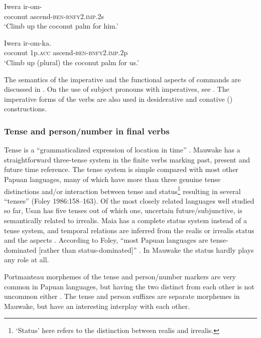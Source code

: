 \ea%
\label{ex:3:x232}
\gll Iwera ir-om- \\
coconut ascend-\textsc{ben}-\textsc{bnfy}2.\textsc{imp}.2s \\
\glt`Climb up the coconut palm for him.'
\z

\ea%
\label{ex:3:x233}
\gll Iwera  ir-om-ka. \\
coconut 1p.\textsc{acc} ascend-\textsc{ben}-\textsc{bnfy}2.\textsc{imp}.2p \\
\glt`Climb up (plural) the coconut palm for us.'
\z

The semantics of the imperative and the functional aspects of commands are discussed in . On the use of subject pronouns with imperatives, see . The imperative forms of the verbs are also used in desiderative  and conative () constructions. 

\subsubsection{Tense and person/number in final verbs}\label{sec:3.8.3.4}
{}
Tense is a ``{grammaticalized expression of location in time}'' \citep[9]{Comrie1985}. Mauwake has a straightforward three-tense system in the finite verbs marking past, present and future time reference. The tense system is simple compared with most other Papuan languages, many of which have more than three genuine tense distinctions and/or interaction between tense and status\footnote{`Status' here refers to the distinction between realis and irrealis.} resulting in several ``tenses'' ({Foley 1986}:158--163). Of the most closely related languages well studied so far, Usan has five tenses \citep[98]{Reesink1987} out of which one, uncertain future/subjunctive, is semantically related to irrealis. Maia has a complete status system instead of a tense system, and temporal relations are inferred from the realis or irrealis status and the aspects \citep[55]{Hardin2002}. According to {Foley}, {``most Papuan languages are tense-dominated [rather than status-dominated]''} \citeyear[162]{Foley1986}. In Mauwake the status hardly plays any role at all.

Portmanteau morphemes of the tense and person/number markers are very common in Papuan languages, but having the two distinct from each other is not uncommon either \citep[137]{Foley1986}. The tense and person suffixes are separate morphemes in Mauwake, but have an interesting interplay with each other.

